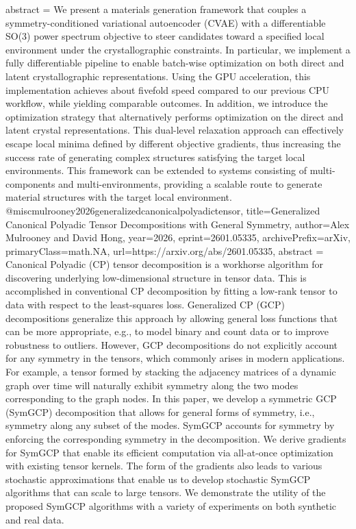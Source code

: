 {      abstract = {We present a materials generation framework that couples a symmetry-conditioned variational autoencoder (CVAE) with a differentiable SO(3) power spectrum objective to steer candidates toward a specified local environment under the crystallographic constraints. In particular, we implement a fully differentiable pipeline to enable batch-wise optimization on both direct and latent crystallographic representations. Using the GPU acceleration, this implementation achieves about fivefold speed compared to our previous CPU workflow, while yielding comparable outcomes. In addition, we introduce the optimization strategy that alternatively performs optimization on the direct and latent crystal representations. This dual-level relaxation approach can effectively escape local minima defined by different objective gradients, thus increasing the success rate of generating complex structures satisfying the target local environments. This framework can be extended to systems consisting of multi-components and multi-environments, providing a scalable route to generate material structures with the target local environment.}
}@misc{mulrooney2026generalizedcanonicalpolyadictensor,
      title={Generalized Canonical Polyadic Tensor Decompositions with General Symmetry}, 
      author={Alex Mulrooney and David Hong},
      year={2026},
      eprint={2601.05335},
      archivePrefix={arXiv},
      primaryClass={math.NA},
      url={https://arxiv.org/abs/2601.05335},
      abstract = {Canonical Polyadic (CP) tensor decomposition is a workhorse algorithm for discovering underlying low-dimensional structure in tensor data. This is accomplished in conventional CP decomposition by fitting a low-rank tensor to data with respect to the least-squares loss. Generalized CP (GCP) decompositions generalize this approach by allowing general loss functions that can be more appropriate, e.g., to model binary and count data or to improve robustness to outliers. However, GCP decompositions do not explicitly account for any symmetry in the tensors, which commonly arises in modern applications. For example, a tensor formed by stacking the adjacency matrices of a dynamic graph over time will naturally exhibit symmetry along the two modes corresponding to the graph nodes. In this paper, we develop a symmetric GCP (SymGCP) decomposition that allows for general forms of symmetry, i.e., symmetry along any subset of the modes. SymGCP accounts for symmetry by enforcing the corresponding symmetry in the decomposition. We derive gradients for SymGCP that enable its efficient computation via all-at-once optimization with existing tensor kernels. The form of the gradients also leads to various stochastic approximations that enable us to develop stochastic SymGCP algorithms that can scale to large tensors. We demonstrate the utility of the proposed SymGCP algorithms with a variety of experiments on both synthetic and real data.}
}
